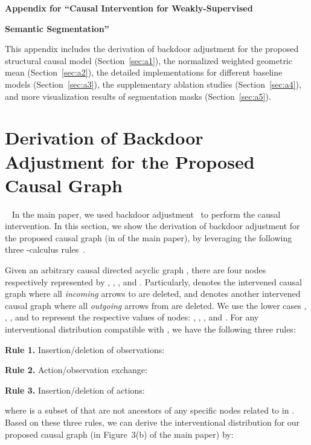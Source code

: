 \setcounter{section}{0}\renewcommand{}
\setcounter{table}{0}
\setcounter{figure}{0}
\centerline{\Large{\textbf{Appendix for ``Causal Intervention for Weakly-Supervised}}}
\centerline{\Large{\textbf{Semantic Segmentation''}}}
\vspace{10mm}
This appendix includes the derivation of backdoor adjustment for the proposed structural causal model (Section~\ref{sec:a1}),
the normalized weighted geometric mean (Section~\ref{sec:a2}),
the detailed implementations for different baseline models (Section~\ref{sec:a3}), the supplementary ablation studies (Section~\ref{sec:a4}), and more visualization results of segmentation masks (Section~\ref{sec:a5}).
\section{Derivation of Backdoor Adjustment for the Proposed Causal Graph}~\label{sec:a1}
In the main paper, we used backdoor adjustment~\cite{pearl2016causal} to perform the causal intervention.
In this section, we show the derivation of backdoor adjustment for the proposed causal graph (in {\color{red}{Figure~3(b)}} of the main paper), by leveraging the following three -calculus rules~\cite{pearl2000}.

Given an arbitrary causal directed acyclic graph , there are four nodes respectively represented by , , , and .
Particularly,  denotes the intervened causal graph where all \emph{incoming} arrows to  are deleted, and  denotes another intervened causal graph where all \emph{outgoing} arrows
from  are deleted. We use the lower cases , , , and  to represent the respective values of
nodes: , , , and . For any interventional distribution compatible with , we have the following three rules:

\textbf{Rule 1.} Insertion/deletion of observations:\label{rule:1}



\textbf{Rule 2.} Action/observation exchange:\label{rule:2}



\textbf{Rule 3.} Insertion/deletion of actions: \label{rule:3}

where  is a subset of  that are not ancestors of any specific nodes related to  in . Based on these three rules, we can derive the interventional distribution  for our proposed causal graph (in Figure~3(b) of the main paper) by:
\vspace{5mm}

